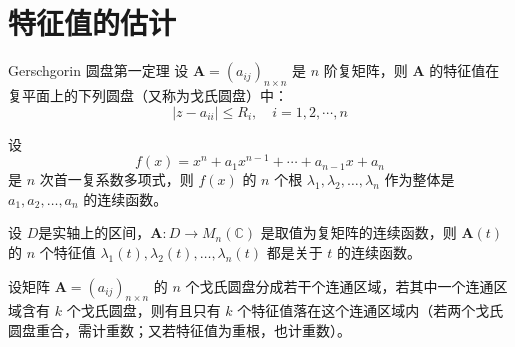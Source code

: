 \section{特征值的估计}

\begin{theorem}{Gerschgorin 圆盘第一定理}
    设 $\bm{A} = (a_{ij})_{n \times n}$ 是 $n$ 阶复矩阵，则 $\bm{A}$ 的特征值在复平面上的下列圆盘（又称为戈氏圆盘）中：
    \[
        \vert z - a_{ii} \vert \leqslant R_i,\quad i = 1, 2, \cdots, n
    \]
\end{theorem}

\begin{theorem}
    设
    \[
        f(x) = x^{n} + a_{1}x^{n - 1} + \cdots + a_{n - 1}x + a_{n}
    \]
    是 $n$ 次首一复系数多项式，则 $f(x)$ 的 $n$ 个根 $\lambda_1, \lambda_2, \ldots, \lambda_n$ 作为整体是 $a_1, a_2, \ldots, a_n$ 的连续函数。
\end{theorem}

\begin{theorem}
  设 $D$是实轴上的区间，$\bm{A}: D \to M_n(\mathbb{C})$ 是取值为复矩阵的连续函数，则 $\bm{A}(t)$ 的 $n$ 个特征值 $\lambda_1(t), \lambda_2(t), \ldots, \lambda_n(t)$ 都是关于 $t$ 的连续函数。
\end{theorem}

\begin{theorem}
  设矩阵 $\bm{A} = (a_{ij})_{n \times n}$ 的 $n$ 个戈氏圆盘分成若干个连通区域，若其中一个连通区域含有 $k$ 个戈氏圆盘，则有且只有 $k$ 个特征值落在这个连通区域内（若两个戈氏圆盘重合，需计重数；又若特征值为重根，也计重数）。
\end{theorem}

